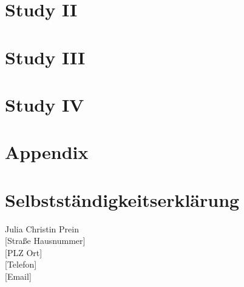 \documentclass[
]{scrbook}
\begin{document}
\chapter{Study II}\label{studyII}

\begin{minipage}{\textwidth}

\end{minipage}



\chapter{Study III}\label{studyIII}

\begin{minipage}{\textwidth}

\end{minipage}



\chapter{Study IV}\label{studyIV}

\begin{minipage}{\textwidth}

\end{minipage}



\chapter*{Appendix}\label{appendix}

\chapter*{Selbstständigkeitserklärung}\label{selbststuxe4ndigkeitserkluxe4rung}

Julia Christin Prein\\
{[}Straße Hausnummer{]}\\
{[}PLZ Ort{]}\\
{[}Telefon{]}\\
{[}Email{]}\\
\end{document}
